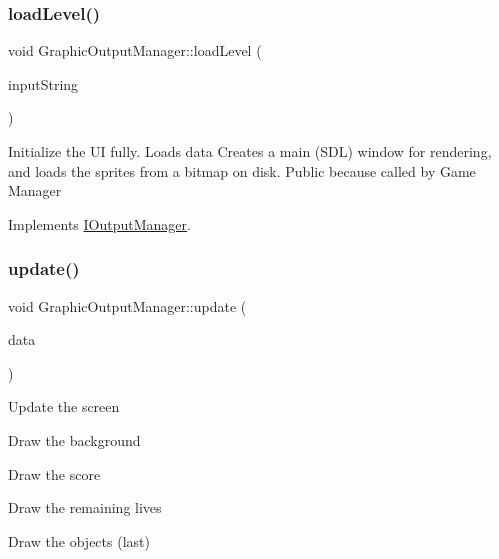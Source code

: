 \subsubsection{\texorpdfstring{load\+Level()}{loadLevel()}}
{\footnotesize\ttfamily void Graphic\+Output\+Manager\+::load\+Level (\begin{DoxyParamCaption}\item[{\mbox{\hyperlink{class_output_data}{Output\+Data}}}]{input\+String }\end{DoxyParamCaption})\hspace{0.3cm}{\ttfamily [virtual]}}

Initialize the UI fully. Loads data Creates a main (S\+DL) window for rendering, and loads the sprites from a bitmap on disk. Public because called by Game Manager 

Implements \mbox{\hyperlink{class_i_output_manager_a50a935d76cf10427b0977406a2338146}{I\+Output\+Manager}}.

\mbox{\label{class_graphic_output_manager_aed60e3ba3328c6ca2ab0b3bf60e9871f}} 
\subsubsection{\texorpdfstring{update()}{update()}\hspace{0.1cm}{\footnotesize\ttfamily [1/2]}}
{\footnotesize\ttfamily void Graphic\+Output\+Manager\+::update (\begin{DoxyParamCaption}\item[{std\+::vector$<$ std\+::shared\+\_\+ptr$<$ \mbox{\hyperlink{class_data_update}{Data\+Update}} $>$$>$}]{data }\end{DoxyParamCaption})}

Update the screen
\begin{DoxyItemize}
\item Draw the background
\item Draw the score
\item Draw the remaining lives
\item Draw the objects (last) 
\end{DoxyItemize}\mbox{\label{class_graphic_output_manager_a64226361d4d827e5c16b76fcf86f4f6f}} 
